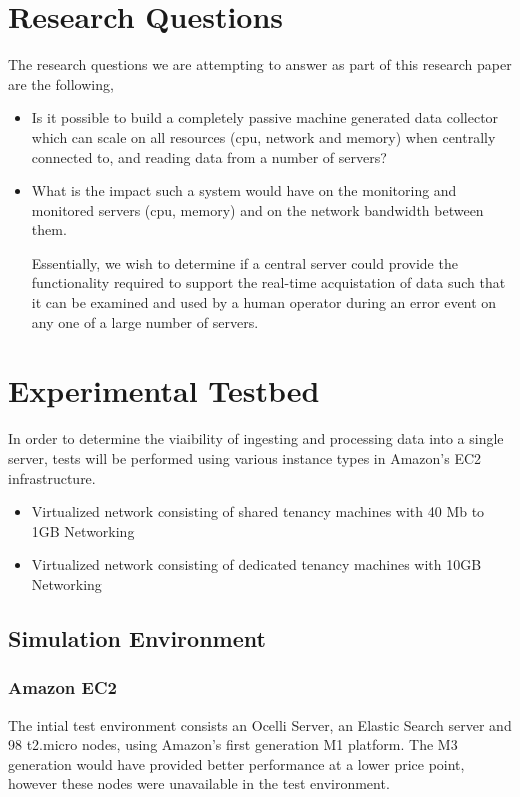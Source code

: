 \documentclass{llncs}
\begin{document}
\section{Research Questions}

The research questions we are attempting to answer as part of this research paper are the following,

\begin{itemize}
\item Is it possible to build a completely passive machine generated data collector which can scale on all resources (cpu, network and memory) when centrally connected to, and reading data from a number of servers?
\item What is the impact such a system would have on the monitoring and monitored servers (cpu, memory) and on the network bandwidth between them.

Essentially, we wish to determine if a central server could provide the functionality required to support the real-time acquistation of data such that it can be examined and used by a human operator during an error event on any one of a large number of servers.
\end{itemize}

\section{Experimental Testbed}

In order to determine the viaibility of ingesting and processing data into a single server, tests will be performed using various instance types in Amazon's EC2 infrastructure.

\begin{itemize}
\item Virtualized network consisting of shared tenancy machines with 40 Mb to 1GB Networking
\item Virtualized network consisting of dedicated tenancy machines with 10GB Networking
\end{itemize}

\subsection{Simulation Environment}

\subsubsection{Amazon EC2}

The intial test environment consists an Ocelli Server, an Elastic Search server and 98 t2.micro nodes, using Amazon's first generation M1 platform. The M3 generation would have provided better performance at a lower price point, however these nodes were unavailable in the test environment.
\end{document}
